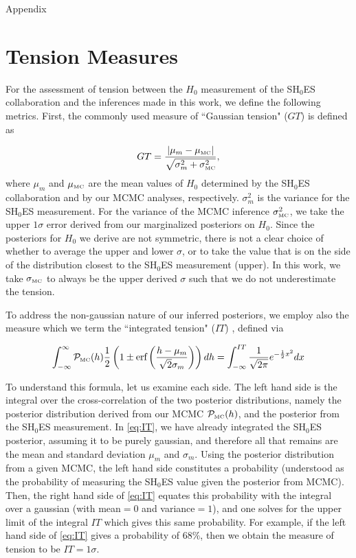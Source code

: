 \documentclass[aps,prd,twocolumn,notitlepage,
superscriptaddress,
nofootinbib,floatfix]{revtex4-2}
\newcommand{\MCMC}{\textrm{\tiny{MC}}}
\newcommand{\beq}{\begin{equation}}
\newcommand{\eeq}{\end{equation}}
\begin{document}
\begin{widetext}
    

\pagebreak
\appendix 
\begin{center}
\Large{Appendix}
\end{center}

\section{Tension Measures}\label{app:integrated_tension}

For the assessment of tension between the $H_0$ measurement of the SH$_0$ES collaboration and the inferences made in this work, we define the following metrics. First, the commonly used measure of ``Gaussian tension" ($GT$) is defined as 

\beq
GT = \frac{|\mu_m-\mu_\MCMC|}{\sqrt{\sigma_m^2+\sigma_\MCMC^2}},
\label{GT}
\eeq
where $\mu_m$ and $\mu_\MCMC$ are the mean values of $H_0$ determined by the SH$_0$ES collaboration and by our MCMC analyses, respectively. $\sigma_m^2$ is the variance for the SH$_0$ES measurement. For the variance of the MCMC inference $\sigma_\MCMC^2$, we take the upper $1\sigma$ error derived from our marginalized posteriors on $H_0$. Since the posteriors for $H_0$ we derive are not symmetric, there is not a clear choice of whether to average the upper and lower $\sigma$, or to take the value that is on the side of the distribution closest to the SH$_0$ES measurement (upper). In this work, we take $\sigma_\MCMC$ to always be the upper derived $\sigma$ such that we do not underestimate the tension. 

To address the non-gaussian nature of our inferred posteriors, we employ also the measure which we term the ``integrated tension" ($IT$) \cite{Allali:2023zbi,Raveri:2021wfz}, defined via

\beq
\int^{\infty}_{-\infty} \mathcal{P}_{\MCMC}(h)\frac{1}{2}\left(1 \pm \mbox{erf}\left(\frac{h-\mu_{m}}{\sqrt{2}\sigma_{m}}\right)\right) dh = \int_{-\infty}^{IT}  \frac{1}{\sqrt{2\pi}}e^{-\frac{1}{2}x^2}dx
\label{eq:IT}
\eeq

To understand this formula, let us examine each side. The left hand side is the integral over the cross-correlation of the two posterior distributions, namely the posterior distribution derived from our MCMC $\mathcal{P}_{\MCMC}(h)$, and the posterior from the SH$_0$ES measurement. In \cref{eq:IT}, we have already integrated the SH$_0$ES posterior, assuming it to be purely gaussian, and therefore all that remains are the mean and standard deviation $\mu_m$ and $\sigma_m$. Using the posterior distribution from a given MCMC, the left hand side constitutes a probability (understood as the probability of measuring the SH$_0$ES value given the posterior from MCMC). Then, the right hand side of \cref{eq:IT} equates this probability with the integral over a gaussian (with mean$=0$ and variance$=1$), and one solves for the upper limit of the integral $IT$ which gives this same probability. For example, if the left hand side of \cref{eq:IT} gives a probability of $68\%$, then we obtain the measure of tension to be $IT=1\sigma$.


\end{widetext}
\end{document}
